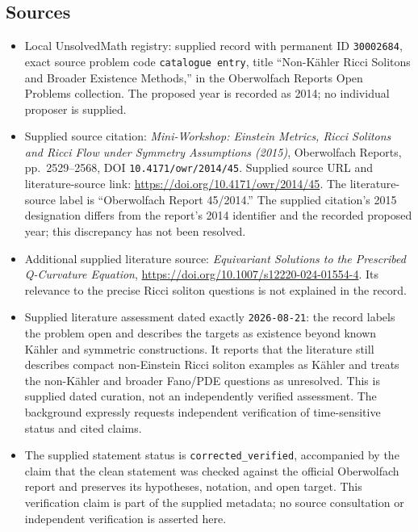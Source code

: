 \documentclass[11pt]{article}
\begin{document}
\subsection{Sources}
\begin{itemize}
\item Local UnsolvedMath registry: supplied record with permanent ID \texttt{30002684}, exact source problem code \texttt{catalogue entry}, title ``Non-K\"ahler Ricci Solitons and Broader Existence Methods,'' in the Oberwolfach Reports Open Problems collection. The proposed year is recorded as 2014; no individual proposer is supplied.
\item Supplied source citation: \emph{Mini-Workshop: Einstein Metrics, Ricci Solitons and Ricci Flow under Symmetry Assumptions (2015)}, Oberwolfach Reports, pp.~2529--2568, DOI \texttt{10.4171/owr/2014/45}. Supplied source URL and literature-source link: \url{https://doi.org/10.4171/owr/2014/45}. The literature-source label is ``Oberwolfach Report 45/2014.'' The supplied citation's 2015 designation differs from the report's 2014 identifier and the recorded proposed year; this discrepancy has not been resolved.
\item Additional supplied literature source: \emph{Equivariant Solutions to the Prescribed Q-Curvature Equation}, \url{https://doi.org/10.1007/s12220-024-01554-4}. Its relevance to the precise Ricci soliton questions is not explained in the record.
\item Supplied literature assessment dated exactly \texttt{2026-08-21}: the record labels the problem open and describes the targets as existence beyond known K\"ahler and symmetric constructions. It reports that the literature still describes compact non-Einstein Ricci soliton examples as K\"ahler and treats the non-K\"ahler and broader Fano/PDE questions as unresolved. This is supplied dated curation, not an independently verified assessment. The background expressly requests independent verification of time-sensitive status and cited claims.
\item The supplied statement status is \texttt{corrected\_verified}, accompanied by the claim that the clean statement was checked against the official Oberwolfach report and preserves its hypotheses, notation, and open target. This verification claim is part of the supplied metadata; no source consultation or independent verification is asserted here.
\end{itemize}
\end{document}
